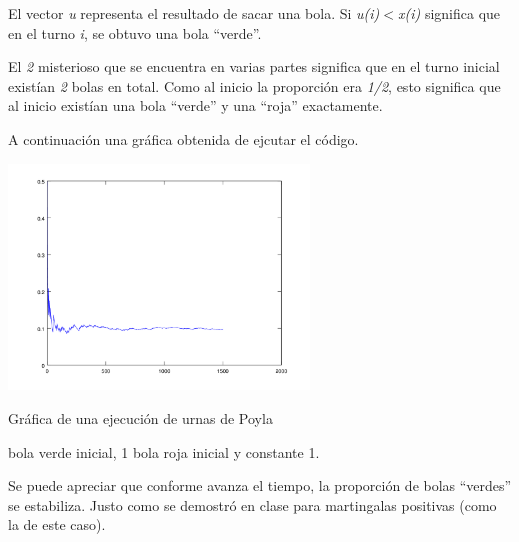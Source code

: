El vector \textsl{u} representa el resultado de sacar una bola. Si \textsl{u(i)$<$x(i)} significa que en el turno \textsl{i}, 
se obtuvo una bola ``verde''.\par\null

El \textsl{2} misterioso que se encuentra en varias partes significa que en el turno inicial existían \textsl{2} bolas en total.
Como al inicio la proporción era \textsl{1/2}, esto significa que al inicio existían una bola ``verde'' y una ``roja'' exactamente.\par\null

A continuación una gráfica obtenida de ejcutar el código.

\begin{center}
    \includegraphics[width=8cm]{tarea2/problema2_2/poyla.PNG}
\end{center}
\begin{center}
    Gráfica de una ejecución de urnas de Poyla \par{} bola verde inicial, 1 bola roja inicial y constante 1.
\end{center}\par\null

Se puede apreciar que conforme avanza el tiempo, la proporción de bolas ``verdes'' se estabiliza. Justo como se demostró en clase para
martingalas positivas (como la de este caso).